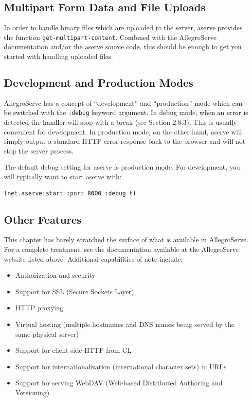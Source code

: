 \subsection{Multipart Form Data and File Uploads}

In order to handle binary files which are uploaded to the server, aserve provides the function
\texttt{get-multipart-content}. Combined with the AllegroServe documentation and/or the
aserve source code, this should be enough to get you started with handling uploaded files.

\subsection{Development and Production Modes}

AllegroServe has a concept of ``development'' and ``production'' mode which can be switched
with the \texttt{:debug} keyword argument. In debug mode, when an error is detected the handler
will stop with a break (see Section 2.8.3). This is usually convenient for development. In
production mode, on the other hand, aserve will simply output a standard HTTP error
response back to the browser and will not stop the server process.

The default debug setting for aserve is production mode. For development, you will
typically want to start aserve with:

\begin{verbatim}
(net.aserve:start :port 8000 :debug t)
\end{verbatim}

\subsection{Other Features}

This chapter has barely scratched the surface of what is available in AllegroServe. For a
complete treatment, see the documentation available at the AllegroServe website listed above.
Additional capabilities of note include:

\begin{itemize}
\item Authorization and security
\item Support for SSL (Secure Sockets Layer)
\item HTTP proxying
\item Virtual hosting (multiple hostnames and DNS names being served by the same physical
server)
\item Support for client-side HTTP from CL
\item Support for internationalization (international character sets) in URLs
\item Support for serving WebDAV (Web-based Distributed Authoring and Versioning)
\end{itemize}

